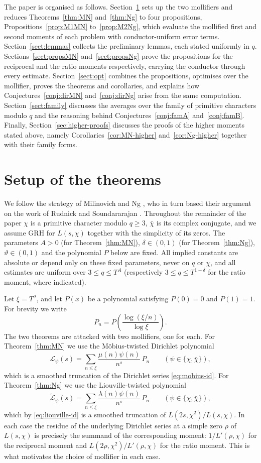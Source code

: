 \documentclass[10pt,a4paper]{amsart}
\numberwithin{equation}{section}
\begin{document}
The paper is organised as follows. Section~\ref{sect:setup} sets up the two mollifiers and reduces Theorems~\ref{thm:MN} and~\ref{thm:Ng} to four propositions, Propositions~\ref{prop:M1MN} to~\ref{prop:M2Ng}, which evaluate the mollified first and second moments of each problem with conductor-uniform error terms. Section~\ref{sect:lemmas} collects the preliminary lemmas, each stated uniformly in $q$. Sections~\ref{sect:propsMN} and~\ref{sect:propsNg} prove the propositions for the reciprocal and the ratio moments respectively, carrying the conductor through every estimate. Section~\ref{sect:opt} combines the propositions, optimises over the mollifier, proves the theorems and corollaries, and explains how Conjectures~\ref{conj:dirMN} and~\ref{conj:dirNg} arise from the same computation. Section~\ref{sect:family} discusses the averages over the family of primitive characters modulo $q$ and the reasoning behind Conjectures~\ref{conj:famA} and~\ref{conj:famB}. Finally, Section~\ref{sec:higher-proofs} discusses the proofs of the higher moments stated above, namely Corollaries~\ref{cor:MN-higher} and~\ref{cor:Ng-higher} together with their family forms.

\section{Setup of the theorems}\label{sect:setup}

We follow the strategy of Milinovich and Ng \cite{MilinovichNg}, who in turn based their argument on the work of Rudnick and Soundararajan \cite{RudnickSound}. Throughout the remainder of the paper $\chi$ is a primitive character modulo $q\ge3$, $\bar\chi$ is its complex conjugate, and we assume GRH for $L(s,\chi)$ together with the simplicity of its zeros. The parameters $A>0$ (for Theorem~\ref{thm:MN}), $\delta\in(0,1)$ (for Theorem~\ref{thm:Ng}), $\vartheta\in(0,1)$ and the polynomial $P$ below are fixed. All implied constants are absolute or depend only on these fixed parameters, never on $q$ or $\chi$, and all estimates are uniform over $3\le q\le T^{A}$ (respectively $3\le q\le T^{1-\delta}$ for the ratio moment, where indicated).

Let $\xi=T^{\vartheta}$, and let $P(x)$ be a polynomial satisfying $P(0)=0$ and $P(1)=1$. For brevity we write
\[
P_n=P\!\left(\frac{\log(\xi/n)}{\log\xi}\right).
\]
The two theorems are attacked with two mollifiers, one for each. For Theorem~\ref{thm:MN} we use the M\"obius-twisted Dirichlet polynomial
\[
\mathcal{L}_{\psi}(s)=\sum_{n\le\xi}\frac{\mu(n)\psi(n)}{n^{s}}\,P_n
\qquad(\psi\in\{\chi,\bar\chi\}),
\]
which is a smoothed truncation of the Dirichlet series \eqref{eq:mobius-id}. For Theorem~\ref{thm:Ng} we use the Liouville-twisted polynomial
\[
\widetilde{\mathcal{L}}_{\psi}(s)=\sum_{n\le\xi}\frac{\lambda(n)\psi(n)}{n^{s}}\,P_n
\qquad(\psi\in\{\chi,\bar\chi\}),
\]
which by \eqref{eq:liouville-id} is a smoothed truncation of $L(2s,\chi^2)/L(s,\chi)$. In each case the residue of the underlying Dirichlet series at a simple zero $\rho$ of $L(s,\chi)$ is precisely the summand of the corresponding moment: $1/L'(\rho,\chi)$ for the reciprocal moment and $L(2\rho,\chi^2)/L'(\rho,\chi)$ for the ratio moment. This is what motivates the choice of mollifier in each case.
\end{document}
